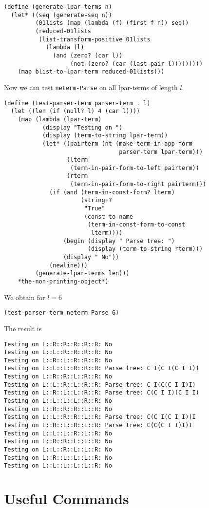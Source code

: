 \documentclass[12pt]{amsart}
\begin{document}
\begin{appendix}
\begin{verbatim}
(define (generate-lpar-terms n)
  (let* ((seq (generate-seq n))
         (01lists (map (lambda (f) (first f n)) seq))
         (reduced-01lists
          (list-transform-positive 01lists
            (lambda (l)
              (and (zero? (car l))
                   (not (zero? (car (last-pair l)))))))))
    (map blist-to-lpar-term reduced-01lists)))
\end{verbatim}
Now we can test \texttt{neterm-Parse} on all lpar-terms of length $l$. 
\begin{verbatim}
(define (test-parser-term parser-term . l)
  (let ((len (if (null? l) 4 (car l))))
    (map (lambda (lpar-term)
           (display "Testing on ")
           (display (term-to-string lpar-term))
           (let* ((pairterm (nt (make-term-in-app-form
                                 parser-term lpar-term)))
                  (lterm
                   (term-in-pair-form-to-left pairterm))
                  (rterm
                   (term-in-pair-form-to-right pairterm)))
             (if (and (term-in-const-form? lterm)
                      (string=?
                       "True"
                       (const-to-name
                        (term-in-const-form-to-const
                         lterm))))
                 (begin (display " Parse tree: ")
                        (display (term-to-string rterm)))
                 (display " No"))
             (newline)))
         (generate-lpar-terms len)))
    *the-non-printing-object*)
\end{verbatim}
We obtain for $l=6$
\begin{verbatim}
(test-parser-term neterm-Parse 6)
\end{verbatim}
The result is
\begin{verbatim}
Testing on L::R::R::R::R::R: No
Testing on L::L::R::R::R::R: No
Testing on L::R::L::R::R::R: No
Testing on L::L::L::R::R::R: Parse tree: C I(C I(C I I))
Testing on L::R::R::L::R::R: No
Testing on L::L::R::L::R::R: Parse tree: C I(C(C I I)I)
Testing on L::R::L::L::R::R: Parse tree: C(C I I)(C I I)
Testing on L::L::L::L::R::R: No
Testing on L::R::R::R::L::R: No
Testing on L::L::R::R::L::R: Parse tree: C(C I(C I I))I
Testing on L::R::L::R::L::R: Parse tree: C(C(C I I)I)I
Testing on L::L::L::R::L::R: No
Testing on L::R::R::L::L::R: No
Testing on L::L::R::L::L::R: No
Testing on L::R::L::L::L::R: No
Testing on L::L::L::L::L::R: No
\end{verbatim}

\section{Useful Commands}
\label{S:Commands}

\end{appendix}
\end{document}
